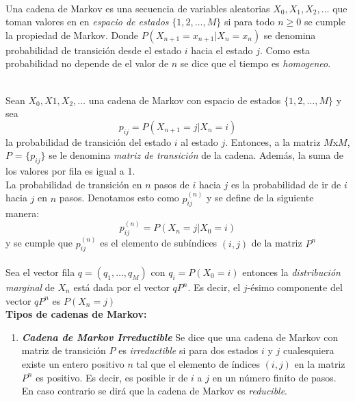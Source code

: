 \documentclass[10pt,a4paper]{article}
\theoremstyle{definition}
\theoremstyle{remark}
\begin{document}
\begin{multicols}{2}
\\
Una cadena de Markov es una secuencia de variables aleatorias $X_{0},X_{1},X_{2},...$ 
que toman valores en en \textit{espacio de estados} $\{1,2,\dots,M\}$ si para todo $n
\geq0$ se cumple la propiedad de Markov. Donde $P(X_{n+1}=x_{n+1}|X_{n}=x_n)$ se 
denomina probabilidad de transición desde el estado $i$ hacia el estado $j$. Como esta 
probabilidad no depende de el valor de $n$ se dice que el tiempo es \textit{homogeneo}.\
\

\\
Sean $X_{0},X{1},X_{2},\dots$ una cadena de Markov con espacio de estados $\{1,2,\dots,M\}$ y sea
\[
p_{ij} = P(X_{n+1}=j|X_{n}=i)
\] 
la probabilidad de transición del estado $i$ al estado $j$. Entonces, a la matriz $M$x$M$, $P$ = $\{p_{ij}\}$ se le denomina \textit{matriz de transición} de la cadena. Además, la suma de los valores por fila es igual a 1.\\

La probabilidad de transición en $n$ pasos de $i$ hacia $j$ es la probabilidad de ir de $i$ hacia $j$ en $n$ pasos. Denotamos esto como $p_{ij}^{(n)}$ y se define de la siguiente manera:
\[
p_{ij}^{(n)} = P(X_{n}=j|X_{0}=i)
\]
y se cumple que $p_{ij}^{(n)}$ es el elemento de subíndices $(i,j)$ de la matriz $P^{n}$\\

\\
Sea el vector fila $q = (q_{1},\dots,q_{M})$ con $q_{i} = P(X_{0} = i)$ entonces la \textit{distribución marginal} de $X_{n}$ está dada por el vector $qP^{n}$. Es decir, el $j$-ésimo componente del vector $qP^{n}$ es $P(X_{n} = j)$\\

\noindent \textbf{Tipos de cadenas de Markov:}\\
\begin{enumerate}
\item \textbf{\textit{Cadena de Markov Irreductible}}
Se dice que una cadena de Markov con matriz de transición $P$ es \textit{irreductible} si para dos estados $i$ y $j$ cualesquiera existe un entero positivo $n$ tal que el elemento de índices $(i,j)$ en la matriz $P^n$ es positivo. Es decir, es posible ir de $i$ a $j$ en un número finito de pasos. En caso contrario se dirá que la cadena de Markov es \textit{reducible}.\\


\end{enumerate}
\end{multicols}
\end{document}
